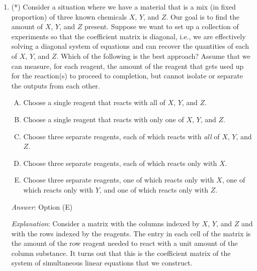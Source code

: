 \documentclass[10pt]{amsart}
\begin{document}
\begin{enumerate}
  {\em Performance review}: 10 out of 27 got this. 10 chose (B), 4
  chose (C), 3 chose (A).

  {\em Historical note (last time)}: $10$ out of $25$ got this. $13$ chose (B),
  $1$ each chose (A) and (C).

The branch of chemistry called quantitative analysis has historically
used stoichiometric methods to determine the proportions of various
chemicals present in a given mix. The idea is to use information about
the amounts needed and produced in various reactions to estimate the
quantities of chemicals present (the possible chemicals are first
identified via ``qualitative analysis'' techniques). We generally find
that these conditions give linear systems, and the coefficient
matrices of these systems have (or can be written in a manner as to
have) small integer entries. 

\item (*) Consider a situation where we have a material that is a mix
  (in fixed proportion) of three known chemicals $X$, $Y$, and
  $Z$. Our goal is to find the amount of $X$, $Y$, and $Z$
  present. Suppose we want to set up a collection of experiments so
  that the coefficient matrix is diagonal, i.e., we are effectively
  solving a diagonal system of equations and can recover the
  quantities of each of $X$, $Y$, and $Z$. Which of the following is
  the best approach?  Assume that we can measure, for each reagent,
  the amount of the reagent that gets used up for the reaction(s) to
  proceed to completion, but cannot isolate or separate the outputs
  from each other.

  \begin{enumerate}[(A)]
  \item Choose a single reagent that reacts with all of $X$, $Y$, and
    $Z$.
  \item Choose a single reagent that reacts with only one of $X$, $Y$,
    and $Z$.
  \item Choose three separate reagents, each of which reacts with {\em
    all} of $X$, $Y$, and $Z$.
  \item Choose three separate reagents, each of which reacts only with
    $X$.
  \item Choose three separate reagents, one of which reacts only with
    $X$, one of which reacts only with $Y$, and one of which reacts
    only with $Z$.
  \end{enumerate}

  {\em Answer}: Option (E)

  {\em Explanation}: Consider a matrix with the columns indexed by
  $X$, $Y$, and $Z$ and with the rows indexed by the reagents. The
  entry in each cell of the matrix is the amount of the row reagent
  needed to react with a unit amount of the column substance. It turns
  out that this is the coefficient matrix of the system of
  simultaneous linear equations that we construct.


\end{enumerate}
\end{document}

